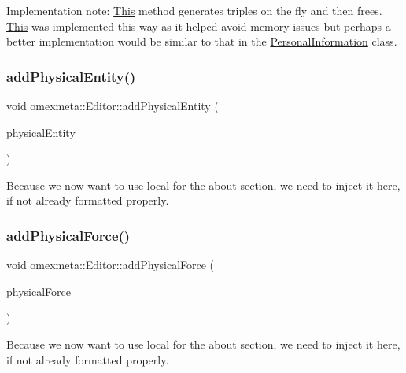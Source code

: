 Implementation note\+: \hyperlink{classThis}{This} method generates triples on the fly and then frees. \hyperlink{classThis}{This} was implemented this way as it helped avoid memory issues but perhaps a better implementation would be similar to that in the \hyperlink{classomexmeta_1_1PersonalInformation}{Personal\+Information} class.\mbox{\label{classomexmeta_1_1Editor_a0740831baafe244374ad7a324d51a87e}} 
\subsubsection{\texorpdfstring{add\+Physical\+Entity()}{addPhysicalEntity()}}
{\footnotesize\ttfamily void omexmeta\+::\+Editor\+::add\+Physical\+Entity (\begin{DoxyParamCaption}\item[{\hyperlink{classomexmeta_1_1PhysicalEntity}{Physical\+Entity} \&}]{physical\+Entity }\end{DoxyParamCaption})}

Because we now want to use  local for the about section, we need to inject it here, if not already formatted properly.\mbox{\label{classomexmeta_1_1Editor_a7833e03995f6323109c2db8d59104f6c}} 
\subsubsection{\texorpdfstring{add\+Physical\+Force()}{addPhysicalForce()}}
{\footnotesize\ttfamily void omexmeta\+::\+Editor\+::add\+Physical\+Force (\begin{DoxyParamCaption}\item[{\hyperlink{classomexmeta_1_1PhysicalForce}{Physical\+Force} \&}]{physical\+Force }\end{DoxyParamCaption})}

Because we now want to use  local for the about section, we need to inject it here, if not already formatted properly.\mbox{\label{classomexmeta_1_1Editor_ae4a608ecbe64f05c1b64efbeeb1fdeb1}} 
